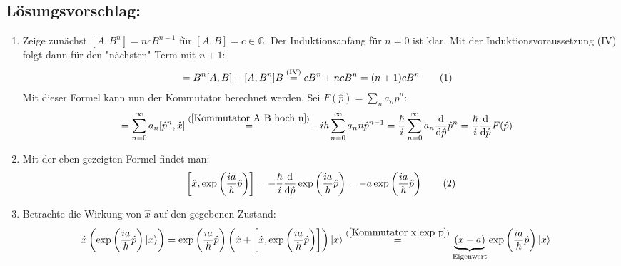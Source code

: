\documentclass[a4paper,12pt]{article}
\newcommand\numberthis{\addtocounter{equation}{1}\tag{\theequation}}
\newcommand{\kla}{}
\newcommand{\klam}{}
\newcommand{\tecxt}{}
\newcommand{\Ket}{}
\begin{document}
\subsection*{Lösungsvorschlag:}
\begin{enumerate}
\item[a)] Zeige zunächst $[A,B^n]=ncB^{n-1}$ für $[A,B]=c\in\mathbb{C}$. Der Induktionsanfang für $n=0$ ist klar. Mit der Induktionsvoraussetzung (IV) folgt dann für den "nächsten" Term mit $n+1$:
\begin{align*}
[A,B^{n+1}]&=B^n[A,B]+[A,B^n]B\overset{(\tecxt\text{IV})}{=} cB^n+ncB^n=(n+1)cB^n\numberthis\label{Kommutator A B hoch n}
\end{align*}
Mit dieser Formel kann nun der Kommutator berechnet werden. Sei $F(\hat{p})=\sum_na_n\hat{p}^n$:
\begin{align*}
[F(\hat{p}),\hat{x}]&=\sum_{n=0}^\infty a_n [\hat{p}^n,\hat{x}]\overset{(\ref{Kommutator A B hoch n})}{=}-i\hbar\sum_{n=0}^\infty a_nn\hat{p}^{n-1}=\frac{\hbar}{i}\sum_{n=0}^\infty a_n\frac{\tecxt\text{d}}{\tecxt\text{d}\hat{p}}\hat{p}^n=\frac{\hbar}{i}\frac{\tecxt\text{d}}{\tecxt\text{d}\hat{p}}F(\hat{p})
\end{align*}
\item[b)] Mit der eben gezeigten Formel findet man:
\begin{align*}
\klam\left[ {\hat{x},\exp\left({\frac{ia}{\hbar}\hat{p}}\right)} \right]=-\frac{\hbar}{i}\frac{\tecxt\text{d}}{\tecxt\text{d}\hat{p}}\exp\left({\frac{ia}{\hbar}\hat{p}}\right)=-a\exp\left({\frac{ia}{\hbar}\hat{p}}\right)\numberthis\label{Kommutator x exp p}
\end{align*}
\item[c)] Betrachte die Wirkung von $\hat{x}$ auf den gegebenen Zustand:
\begin{align*}
\hat{x}\kla\left( {\exp\kla\left( {\frac{ia}{\hbar}\hat{p}} \right)\Ket | {x} \rangle} \right)&=\exp\kla\left( {\frac{ia}{\hbar}\hat{p}} \right)\kla\left( {\hat{x}+\klam\left[ {\hat{x},\exp\kla\left( {\frac{ia}{\hbar}\hat{p}} \right)} \right]} \right)\Ket | {x} \rangle\overset{(\ref{Kommutator x exp p})}{=}\underbrace{(x-a)}_{\tecxt\text{Eigenwert}}\exp\kla\left( {\frac{ia}{\hbar}\hat{p}} \right)\Ket | {x} \rangle
\end{align*}
\end{enumerate}
\end{document}
